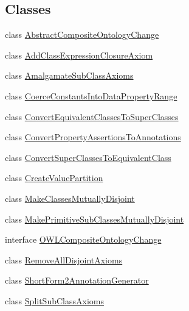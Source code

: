 \subsection*{Classes}
\begin{DoxyCompactItemize}
\item 
class \hyperlink{classorg_1_1semanticweb_1_1owlapi_1_1_abstract_composite_ontology_change}{Abstract\-Composite\-Ontology\-Change}
\item 
class \hyperlink{classorg_1_1semanticweb_1_1owlapi_1_1_add_class_expression_closure_axiom}{Add\-Class\-Expression\-Closure\-Axiom}
\item 
class \hyperlink{classorg_1_1semanticweb_1_1owlapi_1_1_amalgamate_sub_class_axioms}{Amalgamate\-Sub\-Class\-Axioms}
\item 
class \hyperlink{classorg_1_1semanticweb_1_1owlapi_1_1_coerce_constants_into_data_property_range}{Coerce\-Constants\-Into\-Data\-Property\-Range}
\item 
class \hyperlink{classorg_1_1semanticweb_1_1owlapi_1_1_convert_equivalent_classes_to_super_classes}{Convert\-Equivalent\-Classes\-To\-Super\-Classes}
\item 
class \hyperlink{classorg_1_1semanticweb_1_1owlapi_1_1_convert_property_assertions_to_annotations}{Convert\-Property\-Assertions\-To\-Annotations}
\item 
class \hyperlink{classorg_1_1semanticweb_1_1owlapi_1_1_convert_super_classes_to_equivalent_class}{Convert\-Super\-Classes\-To\-Equivalent\-Class}
\item 
class \hyperlink{classorg_1_1semanticweb_1_1owlapi_1_1_create_value_partition}{Create\-Value\-Partition}
\item 
class \hyperlink{classorg_1_1semanticweb_1_1owlapi_1_1_make_classes_mutually_disjoint}{Make\-Classes\-Mutually\-Disjoint}
\item 
class \hyperlink{classorg_1_1semanticweb_1_1owlapi_1_1_make_primitive_sub_classes_mutually_disjoint}{Make\-Primitive\-Sub\-Classes\-Mutually\-Disjoint}
\item 
interface \hyperlink{interfaceorg_1_1semanticweb_1_1owlapi_1_1_o_w_l_composite_ontology_change}{O\-W\-L\-Composite\-Ontology\-Change}
\item 
class \hyperlink{classorg_1_1semanticweb_1_1owlapi_1_1_remove_all_disjoint_axioms}{Remove\-All\-Disjoint\-Axioms}
\item 
class \hyperlink{classorg_1_1semanticweb_1_1owlapi_1_1_short_form2_annotation_generator}{Short\-Form2\-Annotation\-Generator}
\item 
class \hyperlink{classorg_1_1semanticweb_1_1owlapi_1_1_split_sub_class_axioms}{Split\-Sub\-Class\-Axioms}
\end{DoxyCompactItemize}
